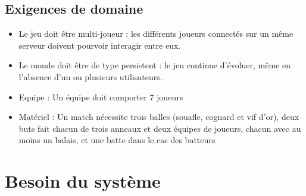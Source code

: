 \documentclass[a4paper]{article}
\begin{document}
\subsection{Exigences de domaine}
\begin{itemize}
\item Le jeu doit être multi-joueur : les différents joueurs connectés sur un même serveur doivent pourvoir interagir entre eux.
\item Le monde doit être de type persistent : le jeu continue d'évoluer, même en l'absence d'un ou plusieurs utilisateurs.
\item Equipe : Un équipe doit comporter 7 joueurs %
\item Matériel : Un match nécessite trois balles (souafle, cognard et vif d'or), deux buts fait chacun de trois anneaux et deux équipes de joueurs, chacun avec au moins un balais, et une batte dans le cas des batteurs %
\end{itemize}


\section{Besoin du système}
\end{document}
